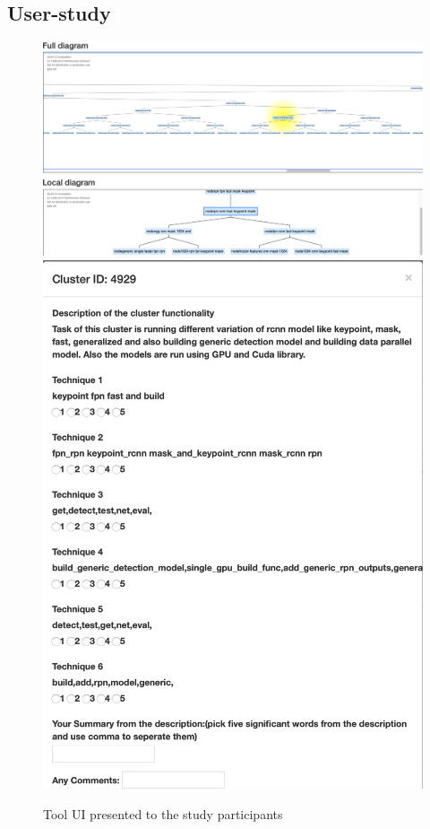 \subsection{User-study}
\begin{figure}[h]
    \begin{center}
    {\includegraphics[scale=0.25]{figures/hla1/ToolUI.png}}
    {\includegraphics[scale=0.23]{figures/hla1/userstudy.png}}
    \caption{Tool UI presented to the study participants}
    \label{fig:tool}
    \end{center}
    
\end{figure}
